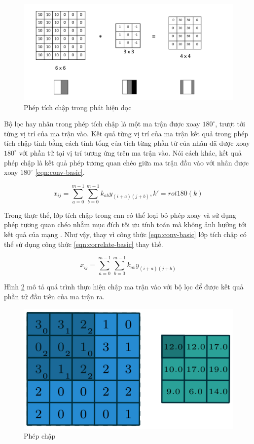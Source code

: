 \begin{figure}[h]
	\centering
	\includegraphics[width=0.8\linewidth]{images/edge-detection-conv}
	\caption{Phép tích chập trong phát hiện dọc}
	\label{fig:edge-detection-conv}
\end{figure}

Bộ lọc hay nhân trong phép tích chập là một ma trận được xoay $180^\circ$, trượt tới từng vị trí của ma trận vào. Kết quả từng vị trí của ma trận kết quả trong phép tích chập tính bằng cách tính tổng của tích từng phần tử của nhân đã được xoay $180^\circ$ với phần tử tại vị trí tương ứng trên ma trận vào. Nói cách khác, kết quả phép chập là kết quả phép tương quan chéo giữa ma trận đầu vào với nhân được xoay $180^\circ$ \ref{eqn:conv-basic}.

\begin{equation}\label{eqn:conv-basic}
	x_{ij} = \sum^{m-1}_{a = 0} \sum^{m-1}_{b = 0} k_{ab} y_{(i+a)(j+b)}, k' = rot180(k)
\end{equation}

Trong thực thế, lớp tích chập trong \acrshort{cnn} có thể loại bỏ phép xoay và sử dụng phép tương quan chéo nhằm mục đích tối ưu tính toán mà không ảnh hưởng tới kết quả của mạng \cite{jorda}. Như vậy, thay vì công thức \ref{eqn:conv-basic} lớp tích chập có thể sử dụng công thức \ref{eqn:correlate-basic} thay thế.

\begin{equation}\label{eqn:correlate-basic}
	x_{ij} = \sum^{m-1}_{a = 0} \sum^{m-1}_{b = 0} k_{ab} y_{(i+a)(j+b)}
\end{equation}

Hình \ref{fig:conv-operation} mô tả quá trình thực hiện chập ma trận vào với bộ lọc để được kết quả phần tử đầu tiên của ma trận ra.

\begin{figure}
	\centering
	\includegraphics[width=0.6\linewidth]{images/conv-operation}
	\caption{Phép chập}
	\label{fig:conv-operation}
\end{figure}


